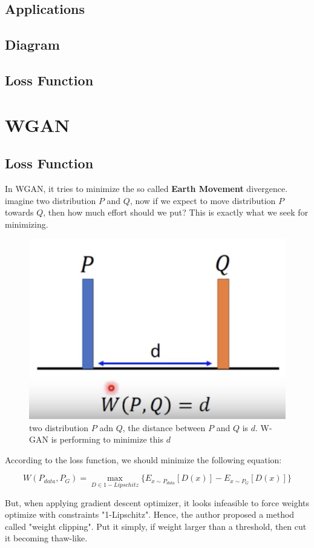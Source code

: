 \documentclass{article}
\begin{document}
\subsection{Applications}
\subsection{Diagram}
\subsection{Loss Function}

\section{WGAN}

\subsection{Loss Function}
In WGAN, it tries to minimize the so called \textbf{Earth Movement} divergence. imagine two distribution $P$ and $Q$, now if we expect to move distribution $P$ towards $Q$, then how much effort should we put? This is exactly what we seek for minimizing.
\begin{figure}[H]
    \centering
    \includegraphics[width=200 pt]{W-GAN_loss}
    \caption{two distribution $P$ adn $Q$, the distance between $P$ and $Q$ is $d$. W-GAN is performing to minimize this $d$}
\end{figure}

According to the loss function, we should minimize the following equation:

\begin{equation}
    W(P_{data},P_G)=\max_{D\in 1-Lipschitz}\{E_{x \sim P_{data}}[D(x)]-E_{x \sim P_{G}}[D(x)]\}
\end{equation}

But, when applying gradient descent optimizer, it looks infeasible to force weights optimize with constraints "1-Lipschitz". Hence, the author proposed a method called "weight clipping". Put it simply, if weight larger than a threshold, then cut it becoming thaw-like.
\end{document}
